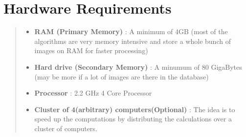 \section*{Hardware Requirements}
\begin{quote}
\begin{itemize}
\item \textbf{RAM (Primary Memory)} : A minimum of 4GB (most of the algorithms are very memory intensive and store a whole bunch of images on RAM for faster processing)
\item \textbf{Hard drive (Secondary Memory)} : A minumum of 80 GigaBytes (may be more if a lot of images are there in the database)
\item \textbf{Processor} : 2.2 GHz 4 Core Processor 
\item \textbf{Cluster of 4(arbitrary) computers(Optional)} : The idea is to speed up the computations by distributing the calculations over a cluster of computers.
\end{itemize}
\end{quote}

